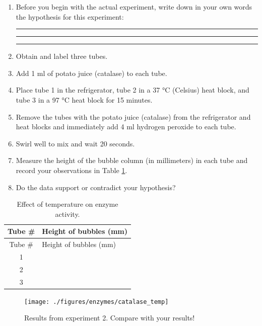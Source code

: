 \documentclass[]{book}
\begin{document}
\begin{enumerate}
\def\labelenumi{\arabic{enumi}.}
\item
  Before you begin with the actual experiment, write down in your own words the hypothesis for this experiment:

  \begin{center}\rule{0.5\linewidth}{\linethickness}\end{center}

  \begin{center}\rule{0.5\linewidth}{\linethickness}\end{center}

  \begin{center}\rule{0.5\linewidth}{\linethickness}\end{center}
\item
  Obtain and label three tubes.
\item
  Add 1 ml of potato juice (catalase) to each tube.
\item
  Place tube 1 in the refrigerator, tube 2 in a 37 °C (Celsius) heat block, and tube 3 in a 97 °C heat block for 15 minutes.
\item
  Remove the tubes with the potato juice (catalase) from the refrigerator and heat blocks and immediately add 4 ml hydrogen peroxide to each tube.
\item
  Swirl well to mix and wait 20 seconds.
\item
  Measure the height of the bubble column (in millimeters) in each tube and record your observations in Table \ref{tab:temp}.
\item
  Do the data support or contradict your hypothesis?
\end{enumerate}

\begin{longtable}[]{@{}cl@{}}
\caption{\label{tab:temp} Effect of temperature on enzyme activity.}\tabularnewline
\toprule
Tube \# & Height of bubbles (mm)\tabularnewline
\midrule
\endfirsthead
\toprule
Tube \# & Height of bubbles (mm)\tabularnewline
\midrule
\endhead
1 &\tabularnewline
2 &\tabularnewline
3 &\tabularnewline
\bottomrule
\end{longtable}

\begin{figure}

{\centering \texttt{[image: ./figures/enzymes/catalase\_temp]} 

}

\caption{Results from experiment 2. Compare with your results!}\label{fig:temp}
\end{figure}
\end{document}
